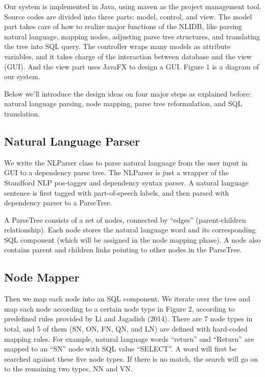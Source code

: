 \documentclass[twocolumn]{article}
\begin{document}
Our system is implemented in Java, using maven as the project management tool. Source codes are divided into three parts: model, control, and view. The model part takes care of how to realize major functions of the NLIDB, like parsing natural language, mapping nodes, adjusting parse tree structures, and translating the tree into SQL query. The controller wraps many models as attribute variables, and it takes charge of the interaction between database and the view (GUI). And the view part uses JavaFX to design a GUI. Figure 1 is a diagram of our system. 

Below we’ll introduce the design ideas on four major steps as explained before: natural language parsing, node mapping, parse tree reformulation, and SQL translation.

\subsection{Natural Language Parser}
We write the NLParser class to parse natural language from the user input in GUI to a dependency parse tree. The NLParser is just a wrapper of the Standford NLP pos-tagger and dependency syntax parser. A natural language sentence is first tagged with part-of-speech labels, and then parsed with dependency parser to a ParseTree.

A ParseTree consists of a set of nodes, connected by ``edges'' (parent-children relationship). Each node stores the natural language word and its corresponding SQL component (which will be assigned in the node mapping phase). A node also contains parent and children links pointing to other nodes in the ParseTree.

\subsection{Node Mapper}
Then we map each node into an SQL component. We iterate over the tree and map each node according to a certain node type in Figure 2, according to predefined rules provided by Li and Jagadish (2014)\cite{li2014}. There are 7 node types in total, and 5 of them (SN, ON, FN, QN, and LN) are defined with hard-coded mapping rules. For example, natural language words “return” and “Return” are mapped to an “SN” node with SQL value “SELECT”. A word will first be searched against these five node types. If there is no match, the search will go on to the remaining two types, NN and VN.
\end{document}
